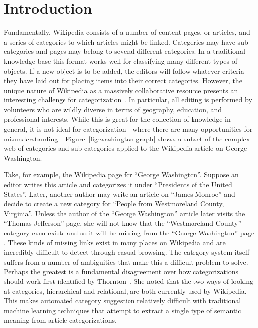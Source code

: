 \documentclass[]{sig-alternate}
\begin{document}
\section{Introduction}
\label{sec:intro}
Fundamentally, Wikipedia consists of a number of content pages, or articles, and a series of categories to which articles might be linked. Categories may have sub categories and pages may belong to several different categories. In a traditional knowledge base this format works well for classifying many different types of objects. If a new object is to be added, the editors will follow whatever criteria they have laid out for placing items into their correct categories. However, the unique nature of Wikipedia as a massively collaborative resource presents an interesting challenge for categorization~\cite{Richardson}. In particular, all editing is performed by volunteers who are wildly diverse in terms of geography, education, and professional interests. While this is great for the collection of knowledge in general, it is not ideal for categorization---where there are many opportunities for misunderstanding~\cite{McDonald}. Figure~\ref{fig:washington-graph} shows a subset of the complex web of categories and sub-categories applied to the Wikipedia article on George Washington.

Take, for example, the Wikipedia page for ``George Washington''. Suppose an editor writes this article and categorizes it under ``Presidents of the United States''. Later, another author may write an article on ``James Monroe'' and decide to create a new category for ``People from Westmoreland County, Virginia''. Unless the author of the ``George Washington'' article later visits the ``Thomas Jefferson'' page, she will not know that the ``Westmoreland County'' category even exists and so it will be missing from the ``George Washington'' page . These kinds of missing links exist in many places on Wikipedia and are incredibly difficult to detect through casual browsing. The category system itself suffers from a number of ambiguities that make this a difficult problem to solve. Perhaps the greatest is a fundamental disagreement over how categorizations should work first identified by Thornton~\cite{Thornton}. She noted that the two ways of looking at categories, hierarchical and relational, are both currently used by Wikipedia. This makes automated category suggestion relatively difficult with traditional machine learning techniques that attempt to extract a single type of semantic meaning from article categorizations.
\end{document}
